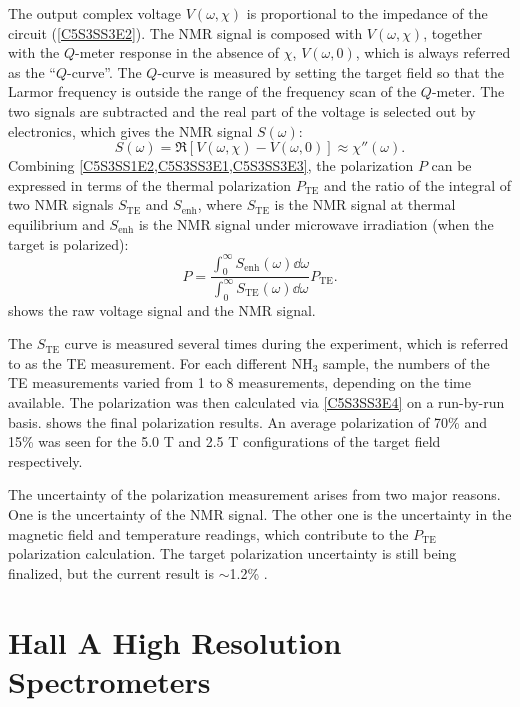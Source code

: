 The output complex voltage $V(\omega,\chi)$ is proportional to the impedance of the circuit (\cref{C5S3SS3E2}). The NMR signal is composed with $V(\omega,\chi)$, together with the $Q$-meter response in the absence of $\chi$, $V(\omega,0)$, which is always referred as the ``$Q$-curve''. The $Q$-curve is measured by setting the target field so that the Larmor frequency is outside the range of the frequency scan of the $Q$-meter. The two signals are subtracted and the real part of the voltage is selected out by electronics, which gives the NMR signal $S(\omega)$:
\begin{equation} \label{C5S3SS3E3}
S(\omega) = \Re[V(\omega,\chi)-V(\omega,0)]\approx\chi''(\omega).
\end{equation}
Combining \cref{C5S3SS1E2,C5S3SS3E1,C5S3SS3E3}, the polarization $P$ can be expressed in terms of the thermal polarization $P_{\mathrm{TE}}$ and the ratio of the integral of two NMR signals $S_{\mathrm{TE}}$ and $S_{\mathrm{enh}}$, where $S_{\mathrm{TE}}$ is the NMR signal at thermal equilibrium and $S_{\mathrm{enh}}$ is the NMR signal under microwave irradiation (when the target is polarized):
\begin{equation} \label{C5S3SS3E4}
P = \frac{\int_0^\infty S_{\mathrm{enh}}(\omega)\dd{\omega}}{\int_0^\infty S_{\mathrm{TE}}(\omega)\dd{\omega}}P_{\mathrm{TE}}.
\end{equation}
 shows the raw voltage signal and the NMR signal.

The $S_{\mathrm{TE}}$ curve is measured several times during the experiment, which is referred to as the TE measurement. For each different NH${}_3$ sample, the numbers of the TE measurements varied from 1 to 8 measurements, depending on the time available. The polarization was then calculated via \cref{C5S3SS3E4} on a run-by-run basis.  shows the final polarization results. An average polarization of 70\% and 15\% was seen for the 5.0 T and 2.5 T configurations of the target field respectively.

The uncertainty of the polarization measurement arises from two major reasons. One is the uncertainty of the NMR signal. The other one is the uncertainty in the magnetic field and temperature readings, which contribute to the $P_{\mathrm{TE}}$ polarization calculation. The target polarization uncertainty is still being finalized, but the current result is $\sim$1.2\% \cite{Badman2013}.

\section{Hall A High Resolution Spectrometers}
\label{C5S4}

